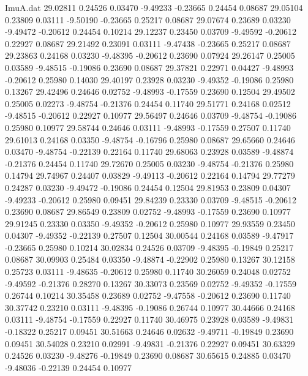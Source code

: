 \begin{filecontents}{ImuA.dat}
  29.02811    0.24526    0.03470   -9.49233   -0.23665    0.24454    0.08687
  29.05104    0.23809    0.03111   -9.50190   -0.23665    0.25217    0.08687
  29.07674    0.23689    0.03230   -9.49472   -0.20612    0.24454    0.10214
  29.12237    0.23450    0.03709   -9.49592   -0.20612    0.22927    0.08687
  29.21492    0.23091    0.03111   -9.47438   -0.23665    0.25217    0.08687
  29.23863    0.24168    0.03230   -9.48395   -0.20612    0.23690    0.07924
  29.26147    0.25005    0.03589   -9.48515   -0.19086    0.23690    0.08687
  29.37821    0.22971    0.04427   -9.48993   -0.20612    0.25980    0.14030
  29.40197    0.23928    0.03230   -9.49352   -0.19086    0.25980    0.13267
  29.42496    0.24646    0.02752   -9.48993   -0.17559    0.23690    0.12504
  29.49502    0.25005    0.02273   -9.48754   -0.21376    0.24454    0.11740
  29.51771    0.24168    0.02512   -9.48515   -0.20612    0.22927    0.10977
  29.56497    0.24646    0.03709   -9.48754   -0.19086    0.25980    0.10977
  29.58744    0.24646    0.03111   -9.48993   -0.17559    0.27507    0.11740
  29.61013    0.24168    0.03350   -9.48754   -0.16796    0.25980    0.08687
  29.65660    0.24646    0.03470   -9.48754   -0.22139    0.22164    0.11740
  29.68063    0.23928    0.03589   -9.48874   -0.21376    0.24454    0.11740
  29.72670    0.25005    0.03230   -9.48754   -0.21376    0.25980    0.14794
  29.74967    0.24407    0.03829   -9.49113   -0.20612    0.22164    0.14794
  29.77279    0.24287    0.03230   -9.49472   -0.19086    0.24454    0.12504
  29.81953    0.23809    0.04307   -9.49233   -0.20612    0.25980    0.09451
  29.84239    0.23330    0.03709   -9.48515   -0.20612    0.23690    0.08687
  29.86549    0.23809    0.02752   -9.48993   -0.17559    0.23690    0.10977
  29.91245    0.23330    0.03350   -9.49352   -0.20612    0.25980    0.10977
  29.93559    0.23450    0.04307   -9.49352   -0.22139    0.27507    0.12504
  30.00544    0.24168    0.03589   -9.47917   -0.23665    0.25980    0.10214
  30.02834    0.24526    0.03709   -9.48395   -0.19849    0.25217    0.08687
  30.09903    0.25484    0.03350   -9.48874   -0.22902    0.25980    0.13267
  30.12158    0.25723    0.03111   -9.48635   -0.20612    0.25980    0.11740
  30.26059    0.24048    0.02752   -9.49592   -0.21376    0.28270    0.13267
  30.33073    0.23569    0.02752   -9.49352   -0.17559    0.26744    0.10214
  30.35458    0.23689    0.02752   -9.47558   -0.20612    0.23690    0.11740
  30.37742    0.23210    0.03111   -9.48395   -0.19086    0.26744    0.10977
  30.44666    0.24168    0.03111   -9.48754   -0.17559    0.22927    0.11740
  30.46975    0.23928    0.03589   -9.49831   -0.18322    0.25217    0.09451
  30.51663    0.24646    0.02632   -9.49711   -0.19849    0.23690    0.09451
  30.54028    0.23210    0.02991   -9.49831   -0.21376    0.22927    0.09451
  30.63329    0.24526    0.03230   -9.48276   -0.19849    0.23690    0.08687
  30.65615    0.24885    0.03470   -9.48036   -0.22139    0.24454    0.10977
\end{filecontents}
